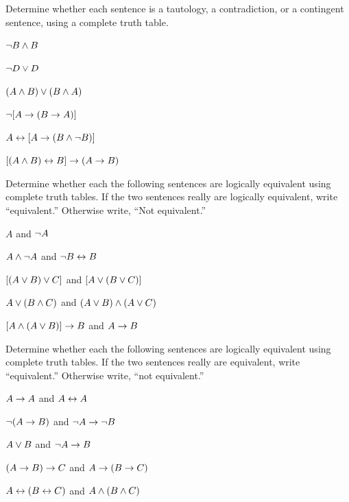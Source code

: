 \problempart Determine whether each sentence is a tautology, a contradiction, or a contingent sentence, using a complete truth table.
\begin{compactlist}
\item $\neg B \wedge B$ \vspace{.5ex} \hfill {}


\item $\neg D \vee D$ \vspace{.5ex} \hfill {}


\item $(A\wedge B) \vee (B\wedge A)$\vspace{.5ex} \hfill {}


\item $\neg[A \rightarrow (B \rightarrow A)]$\vspace{.5ex} \hfill {}


\item $A \leftrightarrow [A \rightarrow (B \wedge \neg B)]$ \vspace{.5ex} \hfill {}


\item $[(A \wedge B) \leftrightarrow B] \rightarrow (A \rightarrow B)$ \vspace{.5ex} \hfill {}


\end{compactlist}

\noindent\problempart
\label{pr.TT.equiv}
Determine whether each the following sentences are logically equivalent using complete truth tables. If the two sentences really are logically equivalent, write ``equivalent.'' Otherwise write, ``Not equivalent.'' 
\begin{compactlist}
\item $A$ and $\neg A$
\item $A \wedge \neg A$ and $\neg B \leftrightarrow B$
\item $[(A \vee B) \vee C]$ and $[A \vee (B \vee C)]$
\item $A \vee (B \wedge C)$ and $(A \vee B) \wedge (A \vee C)$
\item $[A \wedge (A \vee B)] \rightarrow B$ and $A \rightarrow B$\end{compactlist}


\problempart
\label{pr.TT.equiv2}
Determine whether each the following sentences are logically equivalent using complete truth tables. If the two sentences really are equivalent, write ``equivalent.'' Otherwise write, ``not equivalent.''
\begin{compactlist}
\item $A\rightarrow A$ and $A \leftrightarrow A$
\item $\neg(A \rightarrow B)$ and $\neg A \rightarrow \neg B$
\item $A \vee B$ and $\neg A \rightarrow B$
\item$(A \rightarrow B) \rightarrow C$ and $A \rightarrow (B \rightarrow C)$
\item $A \leftrightarrow (B \leftrightarrow C)$ and $A \wedge (B \wedge C)$
\end{compactlist}

